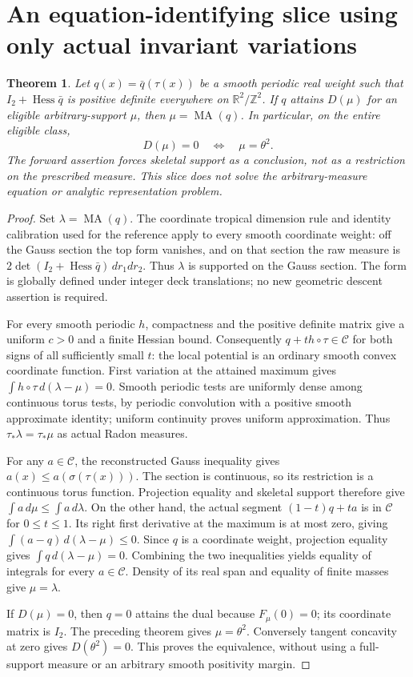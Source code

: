 \documentclass[11pt]{article}
\newtheorem{theorem}{Theorem}
\newcommand{\MA}{\operatorname{MA}}
\newcommand{\C}{\mathcal C}
\begin{document}
\section{An equation-identifying slice using only actual invariant variations}
\begin{theorem}\label{fresh:toric-attainment}
Let $q(x)=\bar q(\tau(x))$ be a smooth periodic real weight such that
$I_2+\operatorname{Hess}\bar q$ is positive definite everywhere on
$\mathbb R^2/\mathbb Z^2$. If $q$ attains $D(\mu)$ for an eligible
arbitrary-support $\mu$, then $\mu=\MA(q)$. In particular, on the
entire eligible class,
\[
 D(\mu)=0\quad\Longleftrightarrow\quad\mu=\theta^2.
\]
The forward assertion forces skeletal support as a conclusion, not
as a restriction on the prescribed measure. This slice does not solve
the arbitrary-measure equation or analytic representation problem.
\end{theorem}
\begin{proof}
Set $\lambda=\MA(q)$. The coordinate tropical dimension rule and
identity calibration used for the reference apply to every smooth
coordinate weight: off the Gauss section the top form vanishes, and
on that section the raw measure is
$2\det(I_2+\operatorname{Hess}\bar q)\,dr_1dr_2$.
Thus $\lambda$ is supported on the Gauss section. The form is globally
defined under integer deck translations; no new geometric descent
assertion is required.

For every smooth periodic $h$, compactness and the positive definite
matrix give a uniform $c>0$ and a finite Hessian bound. Consequently
$q+th\circ\tau\in\C$ for both signs of all sufficiently small $t$:
the local potential is an ordinary smooth convex coordinate function.
First variation at the attained maximum gives
$\int h\circ\tau\,d(\lambda-\mu)=0$.
Smooth periodic tests are uniformly dense among continuous torus
tests, by periodic convolution with a positive smooth approximate
identity; uniform continuity proves uniform approximation.
Thus $\tau_*\lambda=\tau_*\mu$ as actual Radon measures.

For any $a\in\C$, the reconstructed Gauss inequality gives
$a(x)\le a(\sigma(\tau(x)))$. The section is continuous, so its
restriction is a continuous torus function. Projection equality and
skeletal support therefore give $\int a\,d\mu\le\int a\,d\lambda$.
On the other hand, the actual segment $(1-t)q+ta$ is in $\C$ for
$0\le t\le1$. Its right first derivative at the maximum is at most
zero, giving
$\int(a-q)\,d(\lambda-\mu)\le0$. Since $q$ is a coordinate weight,
projection equality gives $\int q\,d(\lambda-\mu)=0$.
Combining the two inequalities yields equality of integrals for every
$a\in\C$. Density of its real span and equality of finite masses
give $\mu=\lambda$.

If $D(\mu)=0$, then $q=0$ attains the dual because $F_\mu(0)=0$;
its coordinate matrix is $I_2$. The preceding theorem gives
$\mu=\theta^2$. Conversely tangent concavity at zero gives
$D(\theta^2)=0$. This proves the equivalence, without using a
full-support measure or an arbitrary smooth positivity margin.
\end{proof}
\end{document}
